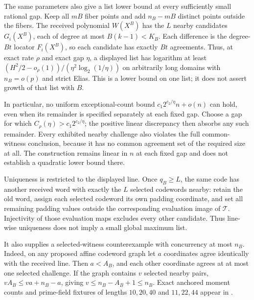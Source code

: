 \documentclass[11pt,letterpaper]{article}
\theoremstyle{definition}
\theoremstyle{remark}
\begin{document}
The same parameters also give a list lower bound at every sufficiently
small rational gap. Keep all $mB$ fiber points and add $n_B-mB$
distinct points outside the fibers. The received polynomial $W(X^B)$
has the $L$ nearby candidates $G_i(X^B)$, each of degree at most
$B(k-1)<K_B$. Each difference is the degree-$Bt$ locator $F_i(X^B)$,
so each candidate has exactly $Bt$ agreements. Thus, at exact rate
$\rho$ and exact gap $\eta$, a displayed list has logarithm at least
$(H^2/2-o_\rho(1))/(\eta^2\log_2(1/\eta))$ on arbitrarily long
domains with $n_B=o(p)$ and strict Elias. This is a lower bound on
one list; it does not assert growth of that list with $B$.

In particular, no uniform exceptional-count bound
$c_1 2^{c_2/\eta}n+o(n)$ can hold, even when its remainder is
specified separately at each fixed gap. Choose a gap for which
$C_\rho(\eta)>c_1 2^{c_2/\eta}$; the positive linear discrepancy
then absorbs any such remainder. Every exhibited nearby challenge
also violates the full common-witness conclusion, because it has no
common agreement set of the required size at all.
The construction remains linear in $n$ at each fixed gap and does
not establish a quadratic lower bound there.

Uniqueness is restricted to the displayed line. Once $q_B\ge L$,
the same code has another received word with exactly the $L$ selected
codewords nearby: retain the old word, assign each selected codeword
its own padding coordinate, and set all remaining padding values
outside the corresponding evaluation image of $\mathcal T$.
Injectivity of those evaluation maps excludes every other candidate.
Thus line-wise uniqueness does not imply a small global maximum list.

It also supplies a selected-witness counterexample with concurrency
at most $n_B$. Indeed, on any proposed affine codeword graph let $a$
coordinates agree identically with the received line. Then
$a<A_B$, and each other coordinate agrees at at most one selected
challenge. If the graph contains $v$ selected nearby pairs,
$vA_B\le va+n_B-a$, giving $v\le n_B-A_B+1\le n_B$.
Exact anchored moment counts and prime-field fixtures of lengths
$10,20,40$ and $11,22,44$ appear in .
\end{document}
